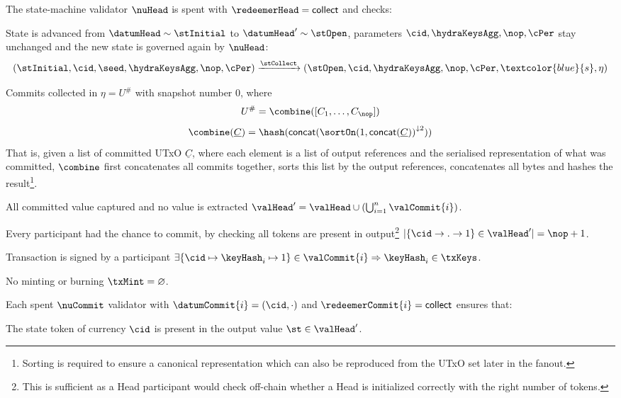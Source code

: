 \noindent The state-machine validator $\nuHead$ is spent with
$\redeemerHead = \mathsf{collect}$ and checks:
\begin{menumerate}
	\item State is advanced from $\datumHead \sim \stInitial$ to
	$\datumHead' \sim \stOpen$, parameters $\cid,\hydraKeysAgg,\nop,\cPer$ stay
	unchanged and the new state is governed again by $\nuHead$:
	\[
		(\stInitial,\cid,\seed,\hydraKeysAgg,\nop,\cPer) \xrightarrow{\stCollect} (\stOpen,\cid,\hydraKeysAgg,\nop,\cPer,\textcolor{blue}{s}, \eta)
	\]
	\item Commits collected in $\eta = U^{\#}$ with snapshot number $0$,
	where
	\[
		U^{\#} = \combine([C_{1}, \dots, C_{\nop}])
	\]
	\[
		\combine(\underline{C}) = \hash(\mathsf{concat}({\sortOn(1, \mathsf{concat}(\underline{C}))}^{\downarrow2}))
	\]
	That is, given a list of committed UTxO $\underline{C}$, where each element is
	a list of output references and the serialised representation of what was
	committed, $\combine$ first concatenates all commits together, sorts this list
	by the output references, concatenates all bytes and hashes the
	result\footnote{Sorting is required to ensure a canonical representation which
		can also be reproduced from the UTxO set later in the fanout.}.

	\item All committed value captured and no value is extracted
	$\valHead' = \valHead \cup (\bigcup_{i=1}^{n} \valCommit{i})$.
	\item Every participant had the chance to commit, by checking all tokens are
	present in output\footnote{This is sufficient as a Head participant would
		check off-chain whether a Head is initialized correctly with the right
		number of tokens.}
	$|\{\cid \rightarrow . \rightarrow 1\} \in \valHead'| = \nop + 1$.
	\item Transaction is signed by a participant $\exists \{\cid \mapsto \keyHash_{i} \mapsto 1\} \in \valCommit{i} \Rightarrow \keyHash_{i} \in \txKeys$.
	\item No minting or burning  $\txMint = \varnothing$.
\end{menumerate}

\noindent Each spent $\nuCommit$ validator with $\datumCommit{i} = (\cid,\cdot)$ and $\redeemerCommit{i} = \mathsf{collect}$ ensures that:
\begin{menumerate}
	\item The state token of currency $\cid$ is present in the output value
	$\st \in \valHead'$.
\end{menumerate}

